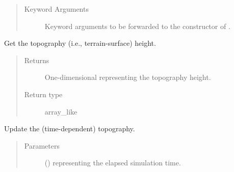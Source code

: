 \documentclass[letterpaper,10pt,english]{sphinxmanual}
\begin{document}
\begin{fulllineitems}
\begin{fulllineitems}
\begin{quote}
\begin{description}
\begin{itemize}
\end{itemize}

\item[{Keyword Arguments}] \leavevmode
{} \textendash{} Keyword arguments to be forwarded to the constructor of {\hyperref[\detokenize{api:tasmania.grids.topography.Topography1d}]{}}.

\end{description}\end{quote}

\end{fulllineitems}


\begin{fulllineitems}
\label{\detokenize{api:tasmania.grids.grid_xz.GridXZ.topography_height}}
Get the topography (i.e., terrain-surface) height.
\begin{quote}\begin{description}
\item[{Returns}] \leavevmode
One-dimensional  representing the topography height.

\item[{Return type}] \leavevmode
array\_like

\end{description}\end{quote}

\end{fulllineitems}


\begin{fulllineitems}
\label{\detokenize{api:tasmania.grids.grid_xz.GridXZ.update_topography}}
Update the (time-dependent) topography.
\begin{quote}\begin{description}
\item[{Parameters}] \leavevmode
{} () \textendash{}  representing the elapsed simulation time.

\end{description}\end{quote}

\end{fulllineitems}


\end{fulllineitems}
\end{document}
